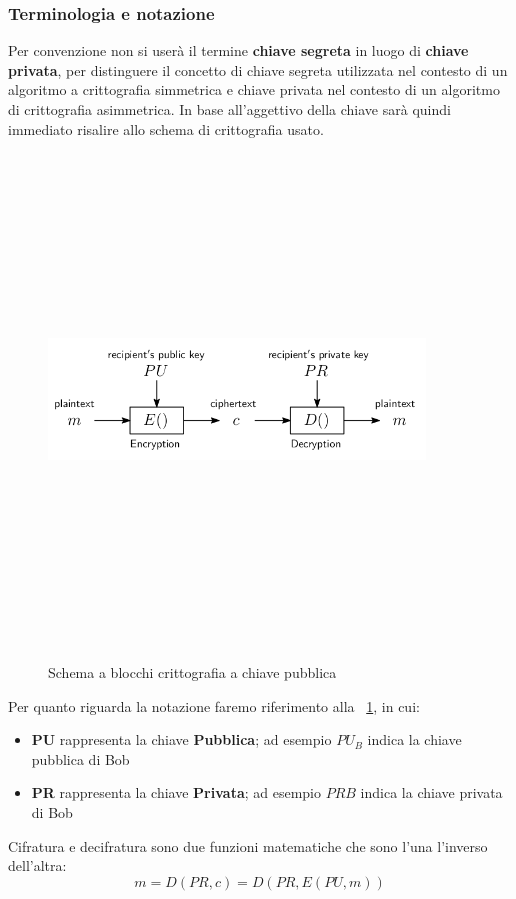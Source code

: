 \subsubsection{Terminologia e notazione}
Per convenzione non si userà il termine \textbf{chiave segreta} in luogo di \textbf{chiave privata}, per distinguere il concetto di chiave segreta utilizzata nel contesto di un algoritmo a crittografia simmetrica e chiave privata nel contesto di un algoritmo di crittografia asimmetrica. In base all’aggettivo della chiave sarà quindi immediato risalire allo schema di crittografia usato.
\begin{figure}[htbp]
	\centering%
	\subfigure%
	{\includegraphics[height=13cm, width=10cm, keepaspectratio]{Immagini/chiave_pubblica/chiave_pubblica_schema.png}}
	\caption{Schema a blocchi crittografia a chiave pubblica \label{fig:pubblica_schema_blocchi}} 	
\end{figure}
Per quanto riguarda la notazione faremo riferimento alla \figurename~\ref{fig:pubblica_schema_blocchi}, in cui:
\begin{itemize}
	\item \textbf{PU} rappresenta la chiave \textbf{Pubblica}; ad esempio $PU_B$ indica la chiave pubblica di Bob
	\item \textbf{PR} rappresenta la chiave \textbf{Privata}; ad esempio $PR B$ indica la chiave privata di Bob
\end{itemize}
Cifratura e decifratura sono due funzioni matematiche che sono l'una l'inverso dell’altra:
\begin{equation}
m = D(PR, c) = D(PR, E (PU, m))
\end{equation}

